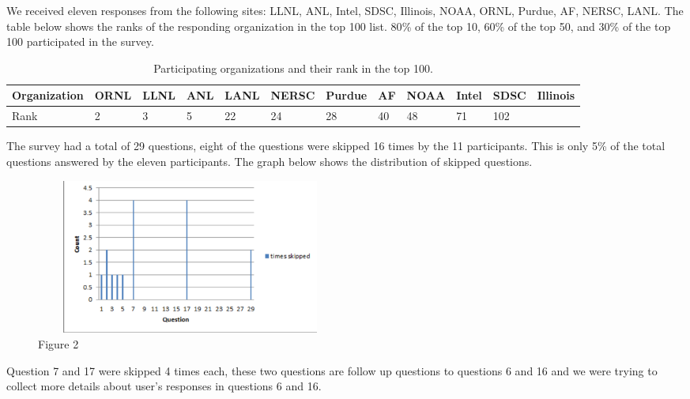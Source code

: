 \documentclass{llncs}
\begin{document}
We received eleven responses from the following sites: LLNL, ANL, Intel,
SDSC, Illinois, NOAA, ORNL, Purdue, AF, NERSC, LANL. The table below shows
the ranks of the responding organization in the top 100 list. 80{\%} of the
top 10, 60{\%} of the top 50, and 30{\%} of the top 100 participated in the
survey.

\begin{table}[htbp]
\begin{center}
\caption{Participating organizations and their rank in the top 100.}
\begin{tabular}{|p{59pt}|l|l|l|l|l|l|l|l|l|l|l|}
\hline
Organization&
ORNL&
LLNL&
ANL&
LANL&
NERSC&
Purdue&
AF&
NOAA&
Intel&
SDSC&
Illinois \\
\hline
Rank&
2&
3&
5&
22&
24&
28&
40&
48&
71&
102&
 \\
\hline
\end{tabular}
\label{tab4}
\end{center}
\end{table}

The survey had a total of 29 questions, eight of the questions were skipped
16 times by the 11 participants. This is only 5{\%} of the total questions
answered by the eleven participants. The graph below shows the distribution
of skipped questions.


\begin{figure}
\includegraphics[width=4.01in,height=2.01in]{figure2}
\caption{Figure 2}
\end{figure}


Question 7 and 17 were skipped 4 times each, these two questions are follow
up questions to questions 6 and 16 and we were trying to collect more
details about user's responses in questions 6 and 16.
\end{document}
